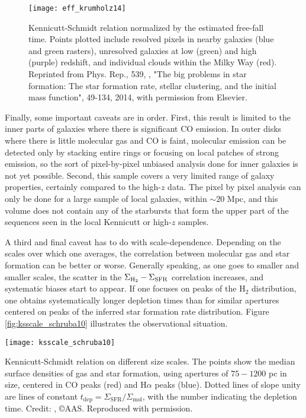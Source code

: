 \begin{figure}
\texttt{[image: eff\_krumholz14]}
\caption[Kennicutt-Schmidt relation normalized by the free-fall time]{
\label{fig:ks_krumholz14}
Kennicutt-Schmidt relation normalized by the estimated free-fall time. Points plotted include resolved pixels in nearby galaxies (blue and green rasters), unresolved galaxies at low (green) and high (purple) redshift, and individual clouds within the Milky Way (red). Reprinted from Phys. Rep., 539, \citeauthor{krumholz14c}, "The big problems in star formation: The star formation rate, stellar clustering, and the initial mass function", 49-134, 2014, with permission from Elsevier.
}
\end{figure}

Finally, some important caveats are in order. First, this result is limited to the inner parts of galaxies where there is significant CO emission. In outer disks where there is little molecular gas and CO is faint, molecular emission can be detected only by stacking entire rings or focusing on local patches of strong emission, so the sort of pixel-by-pixel unbiased analysis done for inner galaxies is not yet possible. Second, this sample covers a very limited range of galaxy properties, certainly compared to the high-$z$ data. The pixel by pixel analysis can only be done for a large sample of local galaxies, within $\sim 20$ Mpc, and this volume does not contain any of the starbursts that form the upper part of the sequences seen in the local Kennicutt or high-$z$ samples.

A third and final caveat has to do with scale-dependence. Depending on the scales over which one averages, the correlation between molecular gas and star formation can be better or worse. Generally speaking, as one goes to smaller and smaller scales, the scatter in the $\Sigma_{\rm H_2} - \Sigma_{\rm SFR}$ correlation increases, and systematic biases start to appear. If one focuses on peaks of the H$_2$ distribution, one obtains systematically longer depletion times than for similar apertures centered on peaks of the inferred star formation rate distribution. Figure \ref{fig:ksscale_schruba10} illustrates the observational situation.
\begin{marginfigure}
\texttt{[image: ksscale\_schruba10]}
\caption[Kennicutt-Schmidt relation averaged on different size scales in M33]{
\label{fig:ksscale_schruba10}
Kennicutt-Schmidt relation on different size scales. The points show the median surface densities of gas and star formation, using apertures of $75-1200$ pc in size, centered in CO peaks (red) and H$\alpha$ peaks (blue). Dotted lines of slope unity are lines of constant $t_{\mathrm{dep}} = \Sigma_{\mathrm{SFR}} / \Sigma_{\mathrm{mol}}$, with the number indicating the depletion time. Credit: \citet{schruba10a}, \copyright AAS. Reproduced with permission.
}
\end{marginfigure}

